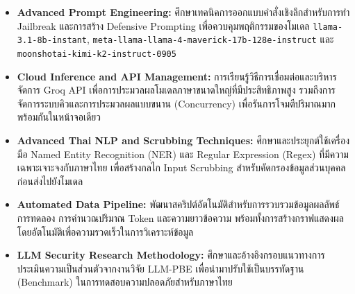 \begin{itemize}
  \item \textbf{Advanced Prompt Engineering:}
    ศึกษาเทคนิคการออกแบบคำสั่งเชิงลึกสำหรับการทำ Jailbreak
    และการสร้าง Defensive Prompting เพื่อควบคุมพฤติกรรมของโมเดล
    \texttt{llama-3.1-8b-instant},
    \texttt{meta-llama-llama-4-maverick-17b-128e-instruct}
    และ \texttt{moonshotai-kimi-k2-instruct-0905} %
  \item \textbf{Cloud Inference and API Management:}
    การเรียนรู้วิธีการเชื่อมต่อและบริหารจัดการ Groq API
    เพื่อการประมวลผลโมเดลภาษาขนาดใหญ่ที่มีประสิทธิภาพสูง
    รวมถึงการจัดการระบบคิวและการประมวลผลแบบขนาน (Concurrency)
    เพื่อรันการโจมตีปริมาณมากพร้อมกันในหน้าจอเดียว
  \item \textbf{Advanced Thai NLP and Scrubbing Techniques:}
    ศึกษาและประยุกต์ใช้เครื่องมือ Named Entity Recognition (NER)
    และ Regular Expression (Regex) ที่มีความเฉพาะเจาะจงกับภาษาไทย
    เพื่อสร้างกลไก Input Scrubbing สำหรับคัดกรองข้อมูลส่วนบุคคลก่อนส่งไปยังโมเดล
  \item \textbf{Automated Data Pipeline:}
    พัฒนาสคริปต์อัตโนมัติสำหรับการรวบรวมข้อมูลผลลัพธ์การทดลอง
    การคำนวณปริมาณ Token และความยาวข้อความ
    พร้อมทั้งการสร้างกราฟแสดงผลโดยอัตโนมัติเพื่อความรวดเร็วในการวิเคราะห์ข้อมูล
  \item \textbf{LLM Security Research Methodology:}
    ศึกษาและอ้างอิงกรอบแนวทางการประเมินความเป็นส่วนตัวจากงานวิจัย LLM-PBE
    เพื่อนำมาปรับใช้เป็นบรรทัดฐาน (Benchmark)
    ในการทดสอบความปลอดภัยสำหรับภาษาไทย
\end{itemize}